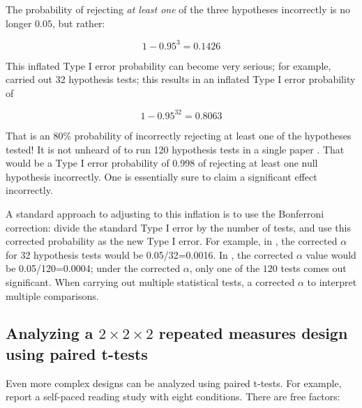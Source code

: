 \documentclass[
  12pt,
]{krantz}
\theoremstyle{definition}
\theoremstyle{definition}
\theoremstyle{definition}
\theoremstyle{definition}
\theoremstyle{remark}
\begin{document}
The probability of rejecting \emph{at least one} of the three hypotheses incorrectly is no longer \(0.05\), but rather:

\begin{equation}
1-0.95^3 = 0.1426
\end{equation}

This inflated Type I error probability can become very serious; for example, \citet{levy2013expectation} carried out 32 hypothesis tests; this results in an inflated Type I error probability of

\begin{equation}
1-0.95^{32} = 0.8063
\end{equation}

That is an 80\% probability of incorrectly rejecting at least one of the hypotheses tested! It is not unheard of to run 120 hypothesis tests in a single paper \citep[e.g.,][]{dillon2012syntactic}. That would be a Type I error probability of 0.998 of rejecting at least one null hypothesis incorrectly. One is essentially sure to claim a significant effect incorrectly.

A standard approach to adjusting to this inflation is to use the Bonferroni correction: divide the standard Type I error by the number of tests, and use this corrected probability as the new Type I error. For example, in \citet{levy2013expectation}, the corrected \(\alpha\) for 32 hypothesis tests would be 0.05/32=0.0016. In \citet{dillon2012syntactic}, the corrected \(\alpha\) value would be 0.05/120=0.0004; under the corrected \(\alpha\), only one of the \(120\) tests comes out significant.
When carrying out multiple statistical tests, a corrected \(\alpha\) to interpret multiple comparisons.

\hypertarget{analyzing-a-2times-2times-2-repeated-measures-design-using-paired-t-tests}{%
\subsection{\texorpdfstring{Analyzing a \(2\times 2\times 2\) repeated measures design using paired t-tests}{Analyzing a 2\textbackslash times 2\textbackslash times 2 repeated measures design using paired t-tests}}\label{analyzing-a-2times-2times-2-repeated-measures-design-using-paired-t-tests}}

Even more complex designs can be analyzed using paired t-tests. For example, \citet{fedorenko2006nature} report a self-paced reading study with eight conditions. There are free factors:
\end{document}
